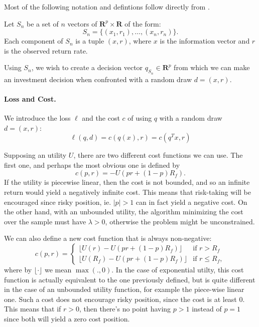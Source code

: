 \documentclass[11pt]{article}
\newcommand{\real}{\bm R}
\theoremstyle{plain}
\theoremstyle{definition}
\begin{document}
Most of the following notation and defintions follow directly from \cite{bousquet2002}.

Let $S_n$ be a set of $n$ vectors of $\real^p\times\real$ of the form:
\begin{equation}
  S_n = \{(x_1,r_1),\ldots,(x_n,r_n)\}.
\end{equation}
Each component of $S_n$ is a tuple $(x,r)$, where $x$ is the information vector and $r$ is
the observed return rate.

Using $S_n$, we wish to create a decision vector $q_{S_n}\in\real^p$ from which we can
make an investment decision when confronted with a random draw $d=(x,r)$.

\paragraph{Loss and Cost.}
We introduce the loss $\ell$ and the cost $c$ of using $q$ with a random draw $d=(x,r)$:
\begin{equation}
\ell(q,d) = c(q(x),r) = c(q^Tx,r)
\end{equation}

Supposing an utility $U$, there are two different cost functions we can use. The first
one, and perhaps the most obvious one is defined by
\begin{equation}
  c(p,r) = -U(pr + (1-p)R_f).
\end{equation}
If the utility is piecewise linear, then the cost is not bounded, and so an infinite
return would yield a negatively infinite cost. This means that risk-taking will be
encouraged since risky position, ie. $|p|>1$ can in fact yield a negative cost. On the
other hand, with an unbounded utility, the algorithm minimizing the cost over the sample
must have $\lambda > 0$, otherwise the problem might be unconstrained. 

We can also define a new cost function that is always non-negative:
\begin{equation}
  c(p,r) =
  \begin{cases}
    \lfloor U(r) - U(pr + (1-p)R_f)\rfloor & \text{if } r>R_f\\
    \lfloor U(R_f) - U(pr + (1-p)R_f)\rfloor &\text{if } r\leq R_f,
  \end{cases}
\end{equation}
where by $\lfloor \cdot \rfloor$ we mean $\max(.,0)$. In the case of exponential
utilty, this cost function is actually equivalent to the one previously defined, but is
quite different in the case of an unbounded utility function, for example the piece-wise
linear one. Such a cost does not encourage risky position, since the cost is at least
0. This means that if $r>0$, then there's no point having $p>1$ instead of $p=1$ since
both will yield a zero cost position. 
\end{document}
